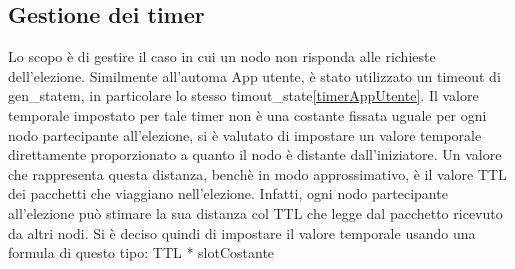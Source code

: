 \subsection{Gestione dei timer}
Lo scopo è di gestire il caso in cui un nodo non risponda alle richieste dell'elezione. Similmente all'automa App utente, è stato utilizzato un timeout di gen\_statem, in particolare lo stesso timout\_state\ref{timerAppUtente}. 
Il valore temporale impostato per tale timer non è una costante fissata uguale per ogni nodo partecipante all'elezione, si è valutato di impostare un valore temporale direttamente proporzionato a quanto il nodo è distante dall'iniziatore.
Un valore che rappresenta questa distanza, benchè in modo approssimativo, è il valore TTL dei pacchetti che viaggiano nell'elezione. Infatti, ogni nodo partecipante all'elezione può stimare la sua distanza col TTL che legge dal pacchetto ricevuto da altri nodi. 
Si è deciso quindi di impostare il valore temporale usando una formula di questo tipo:
TTL * slotCostante

